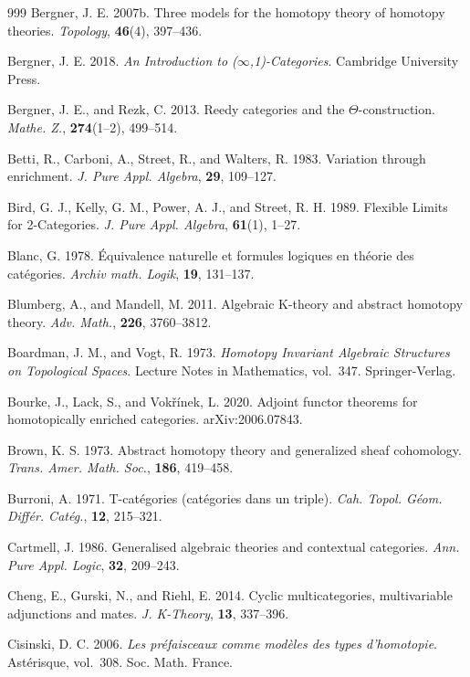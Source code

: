 \begin{thebibliography}{999}
 Bergner, J. E. 2007b. Three models for the homotopy theory of
  homotopy theories. \emph{Topology}, \textbf{46}(4), 397--436.

 Bergner, J. E. 2018. \emph{An Introduction to
  ($\infty$,1)-Categories}. Cambridge University Press.

 Bergner, J. E., and Rezk, C. 2013. Reedy categories and the
  $\Theta$-construction. \emph{Mathe. Z.}, \textbf{274}(1--2), 499--514.

 Betti, R., Carboni, A., Street, R., and Walters, R. 1983.
  Variation through enrichment. \emph{J. Pure Appl. Algebra}, \textbf{29},
  109--127.

 Bird, G. J., Kelly, G. M., Power, A. J., and Street, R. H. 1989.
  Flexible Limits for 2-Categories. \emph{J. Pure Appl. Algebra},
  \textbf{61}(1), 1--27.

 Blanc, G. 1978. Équivalence naturelle et formules logiques en
  théorie des catégories. \emph{Archiv math. Logik}, \textbf{19}, 131--137.

 Blumberg, A., and Mandell, M. 2011. Algebraic K-theory and
  abstract homotopy theory. \emph{Adv. Math.}, \textbf{226}, 3760--3812.

 Boardman, J. M., and Vogt, R. 1973. \emph{Homotopy Invariant
  Algebraic Structures on Topological Spaces}. Lecture Notes in Mathematics,
  vol.~347. Springer-Verlag.

 Bourke, J., Lack, S., and Vokřínek, L. 2020. Adjoint functor
  theorems for homotopically enriched categories. arXiv:2006.07843.

 Brown, K. S. 1973. Abstract homotopy theory and generalized sheaf
  cohomology. \emph{Trans. Amer. Math. Soc.}, \textbf{186}, 419--458.

 Burroni, A. 1971. T-catégories (catégories dans un triple).
  \emph{Cah. Topol. Géom. Différ. Catég.}, \textbf{12}, 215--321.

 Cartmell, J. 1986. Generalised algebraic theories and contextual
  categories. \emph{Ann. Pure Appl. Logic}, \textbf{32}, 209--243.

 Cheng, E., Gurski, N., and Riehl, E. 2014. Cyclic
  multicategories, multivariable adjunctions and mates. \emph{J. K-Theory},
  \textbf{13}, 337--396.

 Cisinski, D. C. 2006. \emph{Les préfaisceaux comme modèles des
  types d'homotopie}. Astérisque, vol.~308. Soc. Math. France.


\end{thebibliography}
